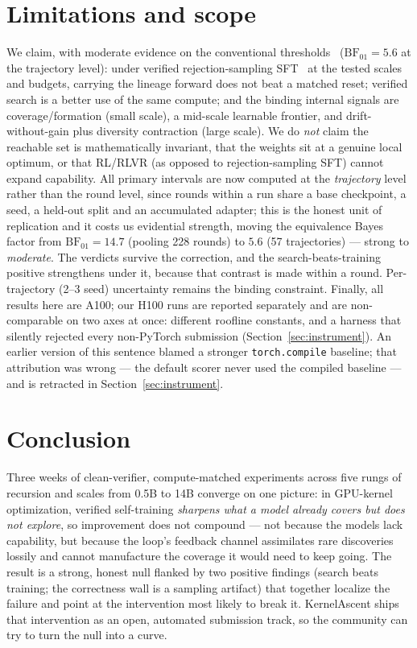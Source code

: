 \section{Limitations and scope}
We claim, with moderate evidence on the conventional thresholds~\cite{kass1995bayesfactors} ($\mathrm{BF}_{01}=5.6$ at the trajectory level): under verified rejection-sampling SFT~\cite{zelikman2022star,gulcehre2023rest} at the tested scales and budgets, carrying
the lineage forward does not beat a matched reset; verified search is a better use of the same compute; and the
binding internal signals are coverage/formation (small scale), a mid-scale learnable frontier, and
drift-without-gain plus diversity contraction (large scale). We do \emph{not} claim the reachable set is
mathematically invariant, that the weights sit at a genuine local optimum, or that RL/RLVR (as opposed to
rejection-sampling SFT) cannot expand capability. All primary intervals are now computed at the
\emph{trajectory} level rather than the round level, since rounds within a run share a base checkpoint, a seed,
a held-out split and an accumulated adapter; this is the honest unit of replication and it costs us evidential
strength, moving the equivalence Bayes factor from $\mathrm{BF}_{01}=14.7$ (pooling 228 rounds) to $5.6$
(57 trajectories) --- strong to \emph{moderate}. The verdicts survive the correction, and the
search-beats-training positive strengthens under it, because that contrast is made within a round. Per-trajectory
(2--3 seed) uncertainty remains the binding constraint. Finally, all results here are A100; our H100 runs are
reported separately and are non-comparable on two axes at once: different roofline constants, and a harness
that silently rejected every non-PyTorch submission (Section~\ref{sec:instrument}). An earlier version of this
sentence blamed a stronger \texttt{torch.compile} baseline; that attribution was wrong --- the default scorer
never used the compiled baseline --- and is retracted in Section~\ref{sec:instrument}.

\section{Conclusion}
Three weeks of clean-verifier, compute-matched experiments across five rungs of recursion and scales from 0.5B
to 14B converge on one picture: in GPU-kernel optimization, verified self-training \emph{sharpens what a model
already covers but does not explore}, so improvement does not compound --- not because the models lack
capability, but because the loop's feedback channel assimilates rare discoveries lossily and cannot manufacture
the coverage it would need to keep going. The result is a strong, honest null flanked by two positive findings
(search beats training; the correctness wall is a sampling artifact) that together localize the failure and
point at the intervention most likely to break it. KernelAscent ships that intervention as an open, automated
submission track, so the community can try to turn the null into a curve.
